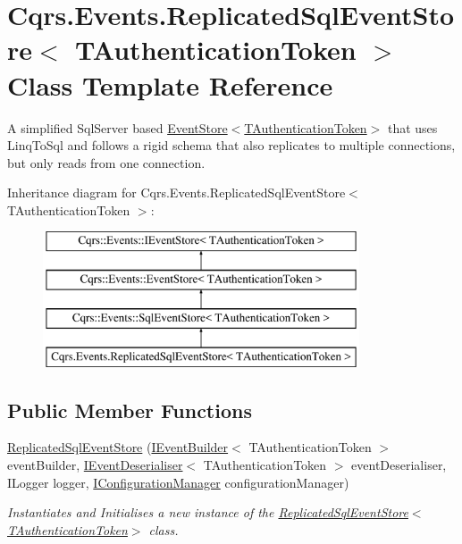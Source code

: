 \hypertarget{classCqrs_1_1Events_1_1ReplicatedSqlEventStore}{}\section{Cqrs.\+Events.\+Replicated\+Sql\+Event\+Store$<$ T\+Authentication\+Token $>$ Class Template Reference}
\label{classCqrs_1_1Events_1_1ReplicatedSqlEventStore}


A simplified Sql\+Server based \hyperlink{classCqrs_1_1Events_1_1EventStore_a6346cb2aea4c5b4e740dc6cfb15abab8_a6346cb2aea4c5b4e740dc6cfb15abab8}{Event\+Store$<$\+T\+Authentication\+Token$>$} that uses Linq\+To\+Sql and follows a rigid schema that also replicates to multiple connections, but only reads from one connection.  


Inheritance diagram for Cqrs.\+Events.\+Replicated\+Sql\+Event\+Store$<$ T\+Authentication\+Token $>$\+:\begin{figure}[H]
\begin{center}
\leavevmode
\includegraphics[height=4.000000cm]{classCqrs_1_1Events_1_1ReplicatedSqlEventStore}
\end{center}
\end{figure}
\subsection*{Public Member Functions}
\begin{DoxyCompactItemize}
\item 
\hyperlink{classCqrs_1_1Events_1_1ReplicatedSqlEventStore_aac9c247dd70c4775cf02f2ad172cd927_aac9c247dd70c4775cf02f2ad172cd927}{Replicated\+Sql\+Event\+Store} (\hyperlink{interfaceCqrs_1_1Events_1_1IEventBuilder}{I\+Event\+Builder}$<$ T\+Authentication\+Token $>$ event\+Builder, \hyperlink{interfaceCqrs_1_1Events_1_1IEventDeserialiser}{I\+Event\+Deserialiser}$<$ T\+Authentication\+Token $>$ event\+Deserialiser, I\+Logger logger, \hyperlink{interfaceCqrs_1_1Configuration_1_1IConfigurationManager}{I\+Configuration\+Manager} configuration\+Manager)
\begin{DoxyCompactList}\small\item\em Instantiates and Initialises a new instance of the \hyperlink{classCqrs_1_1Events_1_1ReplicatedSqlEventStore_aac9c247dd70c4775cf02f2ad172cd927_aac9c247dd70c4775cf02f2ad172cd927}{Replicated\+Sql\+Event\+Store$<$\+T\+Authentication\+Token$>$} class. \end{DoxyCompactList}\end{DoxyCompactItemize}
